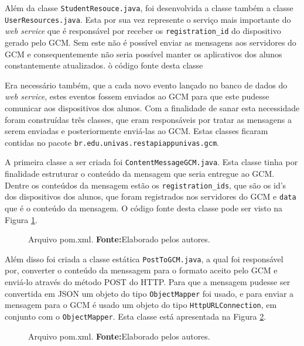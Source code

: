 	\par Além da classe \texttt{StudentResouce.java}, foi desenvolvida
a classe também a classe \texttt{UserResources.java}. Esta por sua vez
represente o serviço mais importante do \textit{web service} que é responsável
por receber os \texttt{registration\_id} do dispositivo gerado pelo GCM. Sem
este não é possível enviar as mensagens aos servidores do GCM e
consequentemente não seria possível manter os aplicativos  dos alunos
constantemente atualizados. ò código fonte desta classe
	
	\par Era necessário também, que a cada novo evento lançado no banco de dados do
\textit{web service}, estes eventos fossem enviados ao GCM para que este pudesse
comunicar aos dispositivos dos alunos. Com a finalidade de sanar esta
necessidade foram construídas três classes, que eram responsáveis por tratar as
mensagens a serem enviadas e posteriormente enviá-las ao GCM. Estas classes
ficaram contidas no pacote \texttt{br.edu.univas.restapiappunivas.gcm}. 



	\par A primeira classe a ser criada foi \texttt{ContentMessageGCM.java}. Esta
classe tinha por finalidade estruturar o conteúdo da mensagem que seria
entregue ao GCM. Dentre os conteúdos da mensagem estão os
\texttt{registration\_ids}, que são os id's dos dispositivos dos alunos, que
foram registrados nos servidores do GCM e \texttt{data} que é o conteúdo da
mensagem. O código fonte desta classe pode ser visto na Figura
\ref{fig:desws30}.

	\begin{figure}[h!]
		
		\caption[Arquivo \texttt{pom.xml}]{Arquivo pom.xml.
		\textbf{Fonte:}Elaborado pelos autores.}
		\label{fig:desws30}
	\end{figure}

	
	\par Além disso foi criada a classe estática \texttt{PostToGCM.java}, a qual
foi responsável por, converter o conteúdo da menssagem para o formato aceito
pelo GCM e enviá-lo através do método POST do HTTP. Para que a mensagem pudesse
ser convertida em JSON um objeto do tipo \texttt{ObjectMapper} foi usado, e
para enviar a mensagem para o GCM é usado um objeto do tipo
\texttt{HttpURLConnection}, em conjunto com o \texttt{ObjectMapper}. Esta classe
está apresentada na Figura \ref{fig:desws31}.

	\begin{figure}[h!]
		
		\caption[Arquivo \texttt{pom.xml}]{Arquivo pom.xml.
		\textbf{Fonte:}Elaborado pelos autores.}
		\label{fig:desws31}
	\end{figure}
	
